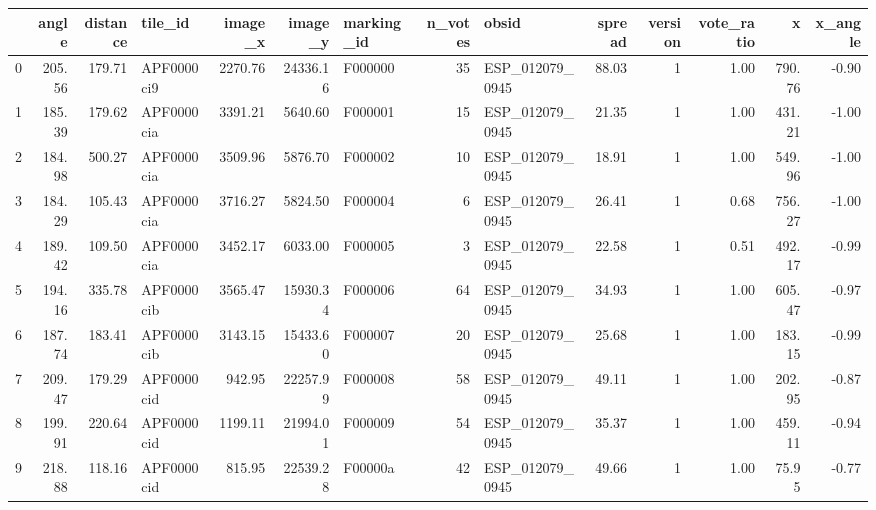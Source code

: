 \begin{tabular}{lrrlrrlrlrrrrr}
\toprule
{} &   angle &  distance &     tile\_id &  image\_x &   image\_y & marking\_id &  n\_votes &            obsid &  spread &  version &  vote\_ratio &       x &  x\_angle \\
\midrule
0 &  205.56 &    179.71 &  APF0000ci9 &  2270.76 &  24336.16 &    F000000 &       35 &  ESP\_012079\_0945 &   88.03 &        1 &        1.00 &  790.76 &    -0.90 \\
1 &  185.39 &    179.62 &  APF0000cia &  3391.21 &   5640.60 &    F000001 &       15 &  ESP\_012079\_0945 &   21.35 &        1 &        1.00 &  431.21 &    -1.00 \\
2 &  184.98 &    500.27 &  APF0000cia &  3509.96 &   5876.70 &    F000002 &       10 &  ESP\_012079\_0945 &   18.91 &        1 &        1.00 &  549.96 &    -1.00 \\
3 &  184.29 &    105.43 &  APF0000cia &  3716.27 &   5824.50 &    F000004 &        6 &  ESP\_012079\_0945 &   26.41 &        1 &        0.68 &  756.27 &    -1.00 \\
4 &  189.42 &    109.50 &  APF0000cia &  3452.17 &   6033.00 &    F000005 &        3 &  ESP\_012079\_0945 &   22.58 &        1 &        0.51 &  492.17 &    -0.99 \\
5 &  194.16 &    335.78 &  APF0000cib &  3565.47 &  15930.34 &    F000006 &       64 &  ESP\_012079\_0945 &   34.93 &        1 &        1.00 &  605.47 &    -0.97 \\
6 &  187.74 &    183.41 &  APF0000cib &  3143.15 &  15433.60 &    F000007 &       20 &  ESP\_012079\_0945 &   25.68 &        1 &        1.00 &  183.15 &    -0.99 \\
7 &  209.47 &    179.29 &  APF0000cid &   942.95 &  22257.99 &    F000008 &       58 &  ESP\_012079\_0945 &   49.11 &        1 &        1.00 &  202.95 &    -0.87 \\
8 &  199.91 &    220.64 &  APF0000cid &  1199.11 &  21994.01 &    F000009 &       54 &  ESP\_012079\_0945 &   35.37 &        1 &        1.00 &  459.11 &    -0.94 \\
9 &  218.88 &    118.16 &  APF0000cid &   815.95 &  22539.28 &    F00000a &       42 &  ESP\_012079\_0945 &   49.66 &        1 &        1.00 &   75.95 &    -0.77 \\
\bottomrule
\end{tabular}
